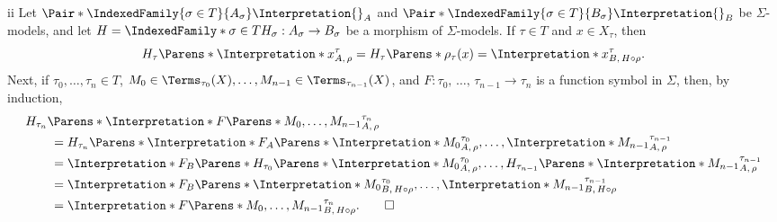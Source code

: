 \begin{partsolution}{ii}
Let \(\Pair*{\IndexedFamily{\sigma\in T}{A_\sigma}}{\Interpretation{}_A}\) and \(\Pair*{\IndexedFamily{\sigma\in T}{B_\sigma}}{\Interpretation{}_B}\) be \(\Sigma\)-models, and let \(H = \IndexedFamily*{\sigma \in T}{H_\sigma : A_\sigma \to B_\sigma}\) be a morphism of \(\Sigma\)-models.
If \(\tau\in T\) and \(x \in X_\tau\), then
\begin{equation*}
H_\tau\Parens*{\Interpretation*{x}_{A,\,\rho}^\tau}
=H_\tau\Parens*{\rho_\tau(x)}
=\Interpretation*{x}_{B,\,H \circ \rho}^\tau.
\end{equation*}
Next, if \(\tau_0,\ldots,\tau_n\in T\), \(M_0 \in \Terms_{\tau_0}(X), \ldots, M_{n-1} \in \Terms_{\tau_{n-1}}(X)\), and \(F : \tau_0,\,\ldots,\,\tau_{n-1} \to \tau_n\) is a function symbol in \(\Sigma\), then, by induction,
\begin{align*}
&H_{\tau_n}\Parens*{\Interpretation*{F\Parens*{M_0,\ldots,M_{n-1}}}_{A,\,\rho}^{\tau_n}} \\
&\qquad= H_{\tau_n}\Parens*{\Interpretation*{F}_A\Parens*{\Interpretation*{M_0}_{A,\,\rho}^{\tau_0},\ldots,\Interpretation*{M_{n-1}}_{A,\,\rho}^{\tau_{n-1}}}} \\
&\qquad= \Interpretation*{F}_B\Parens*{H_{\tau_0}\Parens*{\Interpretation*{M_0}_{A,\,\rho}^{\tau_0}},\ldots,H_{\tau_{n-1}}\Parens*{\Interpretation*{M_{n-1}}_{A,\,\rho}^{\tau_{n-1}}}} \\
&\qquad= \Interpretation*{F}_B\Parens*{\Interpretation*{M_0}_{B,\,H\circ\rho}^{\tau_0},\ldots,\Interpretation*{M_{n-1}}_{B,\,H\circ\rho}^{\tau_{n-1}}} \\
&\qquad=\Interpretation*{F\Parens*{M_0,\ldots,M_{n-1}}}_{B,\,H \circ \rho}^{\tau_n}.
\qedhere
\end{align*}
\end{partsolution}
